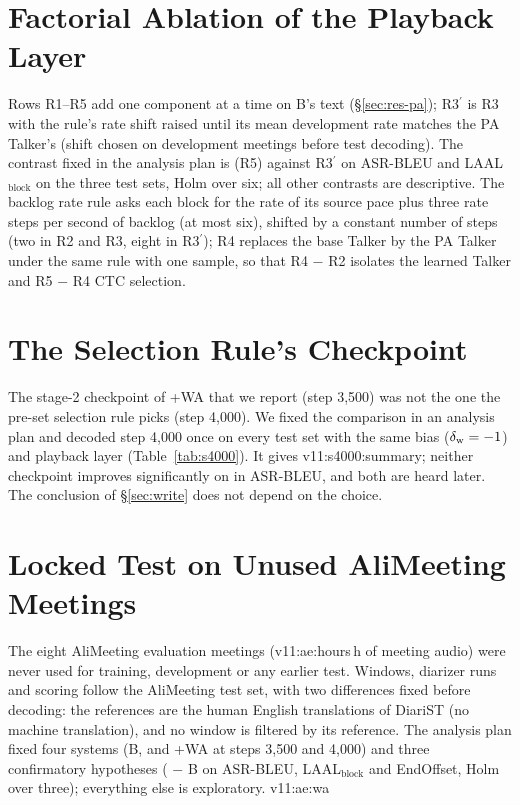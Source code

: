 \ifFactorial
\section{Factorial Ablation of the Playback Layer}
\label{app:factorial}
Rows R1--R5 add one component at a time on B's text (\S\ref{sec:res-pa}); R3$^\prime$ is R3 with the rule's rate
shift raised until its mean development rate matches the PA Talker's (shift chosen on development meetings before
test decoding). The contrast fixed in the analysis plan is \sys{} (R5) against R3$^\prime$ on ASR-BLEU and LAAL$_\text{block}$ on
the three test sets, Holm over six; all other contrasts are descriptive. The backlog rate rule asks each block for
the rate of its source pace plus three rate steps per second of backlog (at most six), shifted by a constant number of
steps (two in R2 and R3, eight in R3$^\prime$); R4 replaces the base Talker by the PA Talker under the same rule with
one sample, so that R4 $-$ R2 isolates the learned Talker and R5 $-$ R4 CTC selection.

\fi

\ifSfourK
\section{The Selection Rule's Checkpoint}
\label{app:s4000}
The stage-2 checkpoint of \sys{}+WA that we report (step 3{,}500) was not the one the pre-set selection rule picks
(step 4{,}000). We fixed the comparison in an analysis plan and decoded step 4{,}000 once on every test set with the same bias
($\delta_{\mathrm{w}}=-1$) and playback layer (Table~\ref{tab:s4000}). It gives \num{v11:s4000:summary}; neither checkpoint improves
significantly on \sys{} in ASR-BLEU, and both are heard later. The conclusion of \S\ref{sec:write} does not depend on the choice.

\fi

\ifAliEval
\section{Locked Test on Unused AliMeeting Meetings}
\label{app:alieval}
The eight AliMeeting evaluation meetings (\num{v11:ae:hours}\,h of meeting audio) were never used for training,
development or any earlier test. Windows, diarizer runs and scoring follow the AliMeeting test set, with two
differences fixed before decoding: the references are the human English translations of DiariST (no machine
translation), and no window is filtered by its reference. The analysis plan fixed four systems (B, \sys{} and
\sys{}+WA at steps 3{,}500 and 4{,}000) and three confirmatory hypotheses (\sys{} $-$ B on ASR-BLEU, LAAL$_\text{block}$
and EndOffset, Holm over three); everything else is exploratory. \num{v11:ae:wa}

\fi

